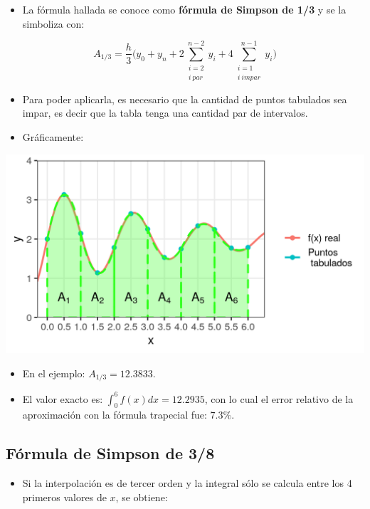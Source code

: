 \documentclass[openany]{book}
\providecommand{\tightlist}{%
  \setlength{\itemsep}{0pt}\setlength{\parskip}{0pt}}
\begin{document}
\begin{itemize}
\tightlist
\item
  La fórmula hallada se conoce como \textbf{fórmula de Simpson de 1/3} y se la simboliza con:
\end{itemize}

\[
A_{1/3} = \frac{h}{3} \Big( y_0 + y_n + 2 \sum \limits_{\substack{i = 2\\ i~par}}^{n-2} y_i + 4 \sum\limits_{\substack{i = 1\\ i~impar}}^{n-1} y_i  \Big)
\]

\begin{itemize}
\item
  Para poder aplicarla, es necesario que la cantidad de puntos tabulados sea impar, es decir que la tabla tenga una cantidad par de intervalos.
\item
  Gráficamente:
\end{itemize}

\begin{center}\includegraphics[width=0.85\linewidth]{Plots/U4/Unidad4_2_g7} \end{center}

\begin{itemize}
\tightlist
\item
  En el ejemplo: \(A_{1/3} = 12.3833\).
\item
  El valor exacto es: \(\int_0^{6}f(x)dx = 12.2935\), con lo cual el error relativo de la aproximación con la fórmula trapecial fue: \(7.3\%\).
\end{itemize}

\hypertarget{fuxf3rmula-de-simpson-de-38}{%
\subsection{Fórmula de Simpson de 3/8}\label{fuxf3rmula-de-simpson-de-38}}

\begin{itemize}
\tightlist
\item
  Si la interpolación es de tercer orden y la integral sólo se calcula entre los 4 primeros valores de \(x\), se obtiene:
\end{itemize}
\end{document}
